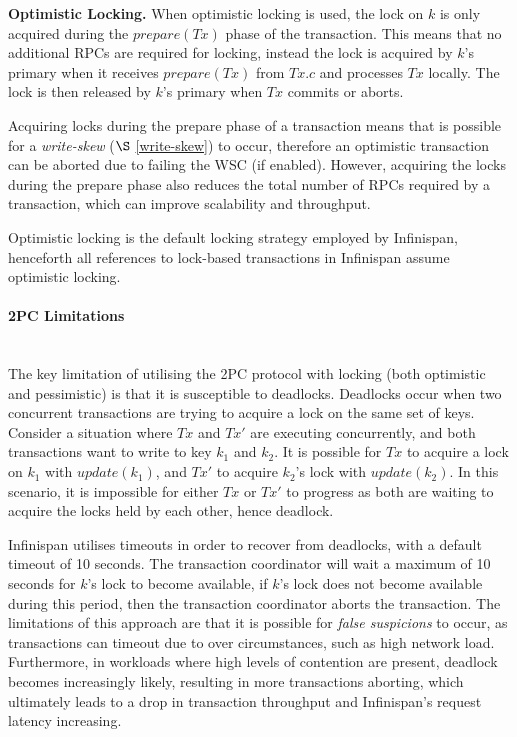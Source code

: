 	        \textbf{Optimistic Locking.}
	        When optimistic locking\citep{Kung:1981:OMC:319566.319567} is used, the lock on $k$ is only acquired during the $prepare(Tx)$ phase of the transaction.  This means that no additional RPCs are required for locking, instead the lock is acquired by $k$'s primary when it receives $prepare(Tx)$ from $Tx.c$ and processes $Tx$ locally.  The lock is then released by $k$'s primary when $Tx$ commits or aborts.  
	        
	        Acquiring locks during the prepare phase of a transaction means that is possible for a  \emph{write-skew} ($\S$ \ref{write-skew}) to occur, therefore an optimistic transaction can be aborted due to failing the WSC (if enabled).  However, acquiring the locks during the prepare phase also reduces the total number of RPCs required by a transaction, which can improve scalability and throughput.  
	        
	        Optimistic locking is the default locking strategy employed by Infinispan, henceforth all references to lock-based transactions in Infinispan assume optimistic locking.  
	        
	        \paragraph{2PC Limitations} \hspace{0pt} \\
	        The key limitation of utilising the 2PC protocol with locking (both optimistic and pessimistic) is that it is susceptible to deadlocks.  Deadlocks occur when two concurrent transactions are trying to acquire a lock on the same set of keys.  Consider a situation where $Tx$ and $Tx'$ are executing concurrently, and both transactions want to write to key $k_1$ and $k_2$.  It is possible for $Tx$ to acquire a lock on $k_1$ with $update(k_1)$, and $Tx'$ to acquire $k_2$'s lock with $update(k_2)$.  In this scenario, it is impossible for either $Tx$ or $Tx'$ to progress as both are waiting to acquire the locks held by each other, hence deadlock.  
	        
	        Infinispan utilises timeouts in order to recover from deadlocks, with a default timeout of 10 seconds.  The transaction coordinator will wait a maximum of 10 seconds for $k$'s lock to become available, if $k$'s lock does not become available during this period, then the transaction coordinator aborts the transaction.  The limitations of this approach are that it is possible for \emph{false suspicions} to occur, as transactions can timeout due to over circumstances, such as high network load.  Furthermore, in workloads where high levels of contention are present, deadlock becomes increasingly likely, resulting in more transactions aborting, which ultimately leads to a drop in transaction throughput and Infinispan's request latency increasing.  

